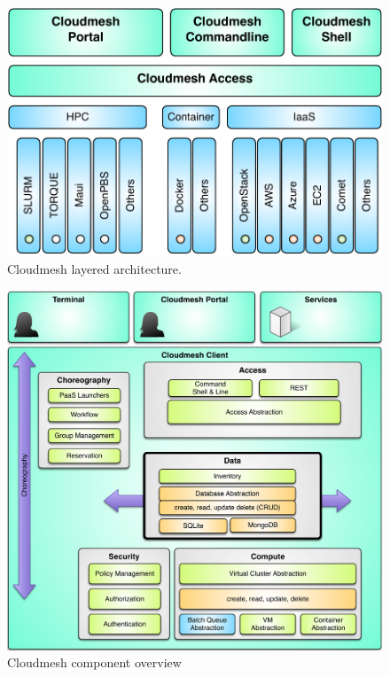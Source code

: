 \begin{figure}[!h] 
  \centering 
    \includegraphics[width=1.0\columnwidth]{images/client/cloudmesh-arch-1.pdf} 
    \caption{Cloudmesh layered architecture.}
    \label{F:arch-1}
\end{figure} 

\begin{figure}[!h] 
  \centering 
    \includegraphics[width=1.0\columnwidth]{images/client/cloudmesh-arch-2.pdf} 
    \caption{Cloudmesh component overview}
    \label{F:arch-2}
\end{figure} 

